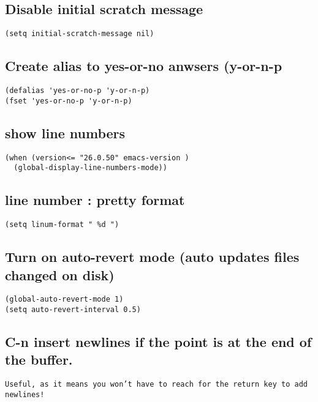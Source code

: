 \documentclass[11pt]{article}
\begin{document}
\subsection*{Disable initial scratch message}
\label{sec:orgfb70ed7}

\begin{verbatim}
(setq initial-scratch-message nil)
\end{verbatim}
\subsection*{Create alias to yes-or-no anwsers (y-or-n-p}
\label{sec:org9189f81}
\begin{verbatim}
(defalias 'yes-or-no-p 'y-or-n-p)
(fset 'yes-or-no-p 'y-or-n-p)
\end{verbatim}

\subsection*{show line numbers}
\label{sec:org46261eb}
\begin{verbatim}
(when (version<= "26.0.50" emacs-version )
  (global-display-line-numbers-mode))
\end{verbatim}

\subsection*{line number : pretty format}
\label{sec:org2111c66}
\begin{verbatim}
(setq linum-format " %d ")
\end{verbatim}

\subsection*{Turn on auto-revert mode (auto updates files changed on disk)}
\label{sec:org910f164}

\begin{verbatim}
(global-auto-revert-mode 1)
(setq auto-revert-interval 0.5)
\end{verbatim}

\subsection*{C-n insert newlines if the point is at the end of the buffer.}
\label{sec:org2f3e86b}

\begin{verbatim}
Useful, as it means you won’t have to reach for the return key to add newlines!
\end{verbatim}
\end{document}
